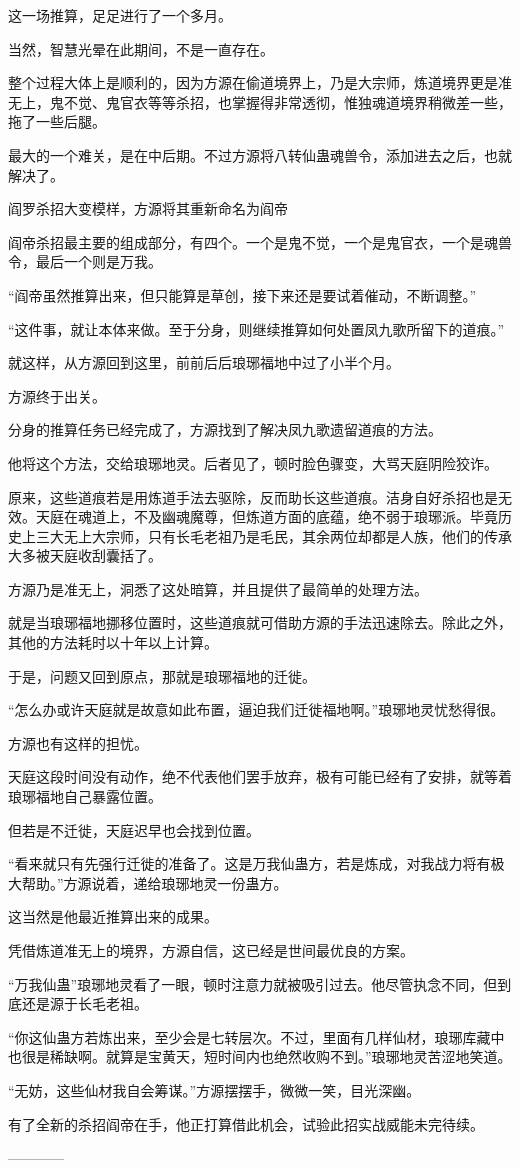 \begin{this_body}
这一场推算，足足进行了一个多月。

当然，智慧光晕在此期间，不是一直存在。

整个过程大体上是顺利的，因为方源在偷道境界上，乃是大宗师，炼道境界更是准无上，鬼不觉、鬼官衣等等杀招，也掌握得非常透彻，惟独魂道境界稍微差一些，拖了一些后腿。

最大的一个难关，是在中后期。不过方源将八转仙蛊魂兽令，添加进去之后，也就解决了。

阎罗杀招大变模样，方源将其重新命名为阎帝

阎帝杀招最主要的组成部分，有四个。一个是鬼不觉，一个是鬼官衣，一个是魂兽令，最后一个则是万我。

“阎帝虽然推算出来，但只能算是草创，接下来还是要试着催动，不断调整。”

“这件事，就让本体来做。至于分身，则继续推算如何处置凤九歌所留下的道痕。”

就这样，从方源回到这里，前前后后琅琊福地中过了小半个月。

方源终于出关。

分身的推算任务已经完成了，方源找到了解决凤九歌遗留道痕的方法。

他将这个方法，交给琅琊地灵。后者见了，顿时脸色骤变，大骂天庭阴险狡诈。

原来，这些道痕若是用炼道手法去驱除，反而助长这些道痕。洁身自好杀招也是无效。天庭在魂道上，不及幽魂魔尊，但炼道方面的底蕴，绝不弱于琅琊派。毕竟历史上三大无上大宗师，只有长毛老祖乃是毛民，其余两位却都是人族，他们的传承大多被天庭收刮囊括了。

方源乃是准无上，洞悉了这处暗算，并且提供了最简单的处理方法。

就是当琅琊福地挪移位置时，这些道痕就可借助方源的手法迅速除去。除此之外，其他的方法耗时以十年以上计算。

于是，问题又回到原点，那就是琅琊福地的迁徙。

“怎么办或许天庭就是故意如此布置，逼迫我们迁徙福地啊。”琅琊地灵忧愁得很。

方源也有这样的担忧。

天庭这段时间没有动作，绝不代表他们罢手放弃，极有可能已经有了安排，就等着琅琊福地自己暴露位置。

但若是不迁徙，天庭迟早也会找到位置。

“看来就只有先强行迁徙的准备了。这是万我仙蛊方，若是炼成，对我战力将有极大帮助。”方源说着，递给琅琊地灵一份蛊方。

这当然是他最近推算出来的成果。

凭借炼道准无上的境界，方源自信，这已经是世间最优良的方案。

“万我仙蛊”琅琊地灵看了一眼，顿时注意力就被吸引过去。他尽管执念不同，但到底还是源于长毛老祖。

“你这仙蛊方若炼出来，至少会是七转层次。不过，里面有几样仙材，琅琊库藏中也很是稀缺啊。就算是宝黄天，短时间内也绝然收购不到。”琅琊地灵苦涩地笑道。

“无妨，这些仙材我自会筹谋。”方源摆摆手，微微一笑，目光深幽。

有了全新的杀招阎帝在手，他正打算借此机会，试验此招实战威能未完待续。

------------

\end{this_body}

